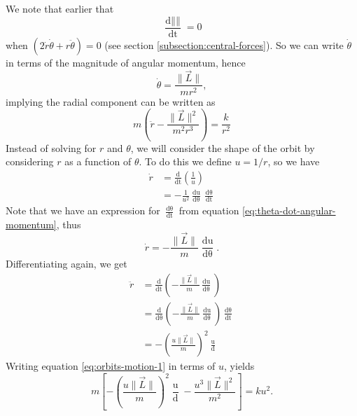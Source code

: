 We note that earlier that
\begin{equation*}
    \frac{\mathop{\mathrm{d}\| \vec{L} \|}}{\mathop{\mathrm{d}t}} = 0 
\end{equation*}
when $\left(2 \dot{r} \dot{\theta} + r \ddot{\theta}\right) = 0$ (see section \ref{subsection:central-forces}). So we can write $\dot{\theta}$ in terms of the magnitude of angular momentum, hence
\begin{equation}
    \label{eq:theta-dot-angular-momentum}
    \dot{\theta} = \frac{\| \vec{L} \|}{m r^2},
\end{equation}
implying the radial component can be written as 
\begin{equation}
    m \left(\ddot{r} - \frac{\| \vec{L} \|^2}{m^2 r^3}\right) = \frac{k}{r^2}
\end{equation}
Instead of solving for $r$ and $\theta$, we will consider the shape of the orbit by considering $r$ as a function of $\theta$. To do this we define $u = 1/r$, so we have
\begin{align*}
    \dot{r} &= \frac{\mathrm{d}}{\mathop{\mathrm{d}t}} \left(\frac{1}{u}\right) \\
    &= - \frac{1}{u^2} \frac{\mathop{\mathrm{d}u}}{\mathop{\mathrm{d}\theta}} \frac{\mathop{\mathrm{d}\theta}}{\mathop{\mathrm{d}t}}
\end{align*}
Note that we have an expression for $\frac{\mathop{\mathrm{d}\theta}}{\mathop{\mathrm{d}t}}$ from equation \ref{eq:theta-dot-angular-momentum}, thus
\begin{equation}
    \label{eq:r-dot-L-theta}
    \dot{r} = - \frac{\| \vec{L} \|}{m} \frac{\mathop{\mathrm{d}u}}{\mathop{\mathrm{d}\theta}}.
\end{equation}
Differentiating again, we get
\begin{align}
    \ddot{r} &= \frac{\mathrm{d}}{\mathop{\mathrm{d}t}} \left( - \frac{\| \vec{L} \|}{m} \frac{\mathop{\mathrm{d}u}}{\mathop{\mathrm{d}\theta}}\right) \\
    &= \frac{\mathrm{d}}{\mathop{\mathrm{d}\theta}} \left( - \frac{\| \vec{L} \|}{m} \frac{\mathop{\mathrm{d}u}}{\mathop{\mathrm{d}\theta}}\right) \frac{\mathop{\mathrm{d}\theta}}{\mathop{\mathrm{d}t}} \\
    &= - \left(\frac{u\| \vec{L} \|}{m}\right)^2 \frac{\mathop{\mathrm{d}^2u}}{\mathop{\mathrm{d}\theta^2}}
    \label{eq:r-2dot-L-theta}
\end{align}
Writing equation \ref{eq:orbits-motion-1} in terms of $u$, yields
\begin{equation}
    m \left[- \left(\frac{u\| \vec{L} \|}{m}\right)^2 \frac{\mathop{\mathrm{d}^2u}}{\mathop{\mathrm{d}\theta^2}} - \frac{u^3 \| \vec{L} \|^2}{m^2}\right] = ku^2.
\end{equation}
